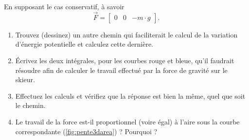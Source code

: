 \documentclass{cup-pan}
\begin{document}
En supposant le cas conservatif, à savoir
\begin{equation}
\vec{F} = \begin{bmatrix} 0 & 0 &-m\cdot g\end{bmatrix}.
\end{equation}

\questions
\begin{enumerate}
    \item Trouvez (dessinez) un autre chemin qui faciliterait le calcul de la variation d'énergie potentielle et calculez cette dernière.
    \item Écrivez les deux intégrales, pour les courbes rouge et bleue, qu'il faudrait résoudre afin de calculer le travail effectué par la force de gravité sur le skieur.
    \item Effectuez les calculs et vérifiez que la réponse est bien la même, quel que soit le chemin.
    \item Le travail de la force est-il proportionnel (voire égal) à l'aire sous la courbe correspondante (\autoref{fig:pente3darea}) ? Pourquoi ? 
\end{enumerate}
\end{document}
